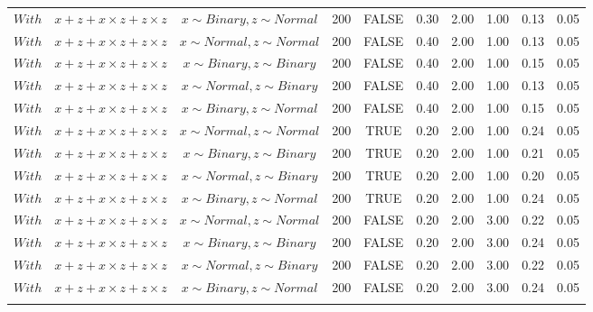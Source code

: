 \begin{longtable}{lccccccccc}
  $With$ & $\textit{x} + \textit{z} + \textit{x} \times \textit{z} + \textit{z} \times \textit{z}$ & $\textit{x} \sim Binary, \textit{z} \sim Normal$ & 200 & FALSE & 0.30 & 2.00 & 1.00 & 0.13 & 0.05 \\ 
  $With$ & $\textit{x} + \textit{z} + \textit{x} \times \textit{z} + \textit{z} \times \textit{z}$ & $\textit{x} \sim Normal , \textit{z} \sim Normal$ & 200 & FALSE & 0.40 & 2.00 & 1.00 & 0.13 & 0.05 \\ 
  $With$ & $\textit{x} + \textit{z} + \textit{x} \times \textit{z} + \textit{z} \times \textit{z}$ & $\textit{x} \sim Binary, \textit{z} \sim Binary$ & 200 & FALSE & 0.40 & 2.00 & 1.00 & 0.15 & 0.05 \\ 
  $With$ & $\textit{x} + \textit{z} + \textit{x} \times \textit{z} + \textit{z} \times \textit{z}$ & $\textit{x} \sim Normal, \textit{z} \sim Binary$ & 200 & FALSE & 0.40 & 2.00 & 1.00 & 0.13 & 0.05 \\ 
  $With$ & $\textit{x} + \textit{z} + \textit{x} \times \textit{z} + \textit{z} \times \textit{z}$ & $\textit{x} \sim Binary, \textit{z} \sim Normal$ & 200 & FALSE & 0.40 & 2.00 & 1.00 & 0.15 & 0.05 \\ 
  $With$ & $\textit{x} + \textit{z} + \textit{x} \times \textit{z} + \textit{z} \times \textit{z}$ & $\textit{x} \sim Normal , \textit{z} \sim Normal$ & 200 & TRUE & 0.20 & 2.00 & 1.00 & 0.24 & 0.05 \\ 
  $With$ & $\textit{x} + \textit{z} + \textit{x} \times \textit{z} + \textit{z} \times \textit{z}$ & $\textit{x} \sim Binary, \textit{z} \sim Binary$ & 200 & TRUE & 0.20 & 2.00 & 1.00 & 0.21 & 0.05 \\ 
  $With$ & $\textit{x} + \textit{z} + \textit{x} \times \textit{z} + \textit{z} \times \textit{z}$ & $\textit{x} \sim Normal, \textit{z} \sim Binary$ & 200 & TRUE & 0.20 & 2.00 & 1.00 & 0.20 & 0.05 \\ 
  $With$ & $\textit{x} + \textit{z} + \textit{x} \times \textit{z} + \textit{z} \times \textit{z}$ & $\textit{x} \sim Binary, \textit{z} \sim Normal$ & 200 & TRUE & 0.20 & 2.00 & 1.00 & 0.24 & 0.05 \\ 
  $With$ & $\textit{x} + \textit{z} + \textit{x} \times \textit{z} + \textit{z} \times \textit{z}$ & $\textit{x} \sim Normal , \textit{z} \sim Normal$ & 200 & FALSE & 0.20 & 2.00 & 3.00 & 0.22 & 0.05 \\ 
  $With$ & $\textit{x} + \textit{z} + \textit{x} \times \textit{z} + \textit{z} \times \textit{z}$ & $\textit{x} \sim Binary, \textit{z} \sim Binary$ & 200 & FALSE & 0.20 & 2.00 & 3.00 & 0.24 & 0.05 \\ 
  $With$ & $\textit{x} + \textit{z} + \textit{x} \times \textit{z} + \textit{z} \times \textit{z}$ & $\textit{x} \sim Normal, \textit{z} \sim Binary$ & 200 & FALSE & 0.20 & 2.00 & 3.00 & 0.22 & 0.05 \\ 
  $With$ & $\textit{x} + \textit{z} + \textit{x} \times \textit{z} + \textit{z} \times \textit{z}$ & $\textit{x} \sim Binary, \textit{z} \sim Normal$ & 200 & FALSE & 0.20 & 2.00 & 3.00 & 0.24 & 0.05 \\ 
   \hline
\hline
\label{tab:apptabFullBC}
\end{longtable}
